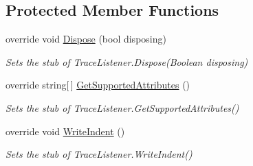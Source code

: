 \subsection*{Protected Member Functions}
\begin{DoxyCompactItemize}
\item 
override void \hyperlink{class_system_1_1_diagnostics_1_1_fakes_1_1_stub_default_trace_listener_a7c1df6408b1a4805a871e9ea72461ef5}{Dispose} (bool disposing)
\begin{DoxyCompactList}\small\item\em Sets the stub of Trace\-Listener.\-Dispose(\-Boolean disposing)\end{DoxyCompactList}\item 
override string\mbox{[}$\,$\mbox{]} \hyperlink{class_system_1_1_diagnostics_1_1_fakes_1_1_stub_default_trace_listener_ae8f49a282257ce7fb25344e1da2ae496}{Get\-Supported\-Attributes} ()
\begin{DoxyCompactList}\small\item\em Sets the stub of Trace\-Listener.\-Get\-Supported\-Attributes()\end{DoxyCompactList}\item 
override void \hyperlink{class_system_1_1_diagnostics_1_1_fakes_1_1_stub_default_trace_listener_a9167fb976d91a1f706840c532556cd84}{Write\-Indent} ()
\begin{DoxyCompactList}\small\item\em Sets the stub of Trace\-Listener.\-Write\-Indent()\end{DoxyCompactList}\end{DoxyCompactItemize}
